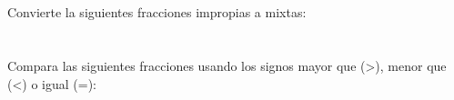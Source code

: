 \documentclass[12pt,addpoints]{evalua}
\begin{document}
\begin{questions}
    \subsection*{\else{}\fi}

    \question[4] Convierte la siguientes fracciones impropias a mixtas:
    \begin{multicols}{2}
    \end{multicols}

    \newpage
    \section*{\else{}\fi}

    \subsection*{\else{}\fi}

    \question[8] Compara las siguientes fracciones usando los signos mayor que (>), menor que (<) o igual (=):
    \begin{multicols}{2}
\end{multicols}
\end{questions}
\end{document}
